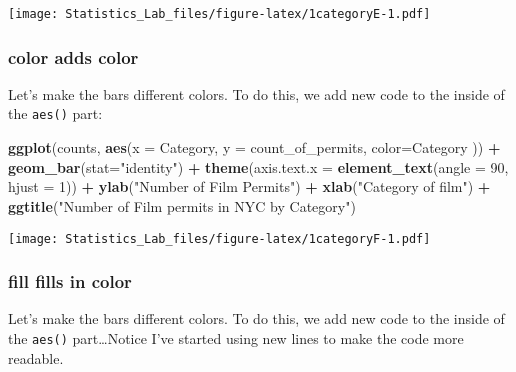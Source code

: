 \documentclass[
]{book}
\newenvironment{Shaded}{\begin{snugshade}}{\end{snugshade}}
\newcommand{\AttributeTok}[1]{\textcolor[rgb]{0.13,0.29,0.53}{#1}}
\newcommand{\DecValTok}[1]{\textcolor[rgb]{0.00,0.00,0.81}{#1}}
\newcommand{\FunctionTok}[1]{\textcolor[rgb]{0.13,0.29,0.53}{\textbf{#1}}}
\newcommand{\NormalTok}[1]{#1}
\newcommand{\SpecialCharTok}[1]{\textcolor[rgb]{0.81,0.36,0.00}{\textbf{#1}}}
\newcommand{\StringTok}[1]{\textcolor[rgb]{0.31,0.60,0.02}{#1}}
\begin{document}
\texttt{[image: Statistics\_Lab\_files/figure-latex/1categoryE-1.pdf]}

\hypertarget{color-adds-color}{%
\subsubsection{color adds color}\label{color-adds-color}}

Let's make the bars different colors. To do this, we add new code to the inside of the \texttt{aes()} part:

\begin{Shaded}
\begin{Highlighting}[]
\FunctionTok{ggplot}\NormalTok{(counts, }\FunctionTok{aes}\NormalTok{(}\AttributeTok{x =}\NormalTok{ Category, }\AttributeTok{y =}\NormalTok{ count\_of\_permits, }\AttributeTok{color=}\NormalTok{Category )) }\SpecialCharTok{+}
  \FunctionTok{geom\_bar}\NormalTok{(}\AttributeTok{stat=}\StringTok{"identity"}\NormalTok{) }\SpecialCharTok{+} 
  \FunctionTok{theme}\NormalTok{(}\AttributeTok{axis.text.x =} \FunctionTok{element\_text}\NormalTok{(}\AttributeTok{angle =} \DecValTok{90}\NormalTok{, }\AttributeTok{hjust =} \DecValTok{1}\NormalTok{)) }\SpecialCharTok{+}
  \FunctionTok{ylab}\NormalTok{(}\StringTok{"Number of Film Permits"}\NormalTok{) }\SpecialCharTok{+} 
  \FunctionTok{xlab}\NormalTok{(}\StringTok{"Category of film"}\NormalTok{) }\SpecialCharTok{+}
  \FunctionTok{ggtitle}\NormalTok{(}\StringTok{"Number of Film permits in NYC by Category"}\NormalTok{)}
\end{Highlighting}
\end{Shaded}

\texttt{[image: Statistics\_Lab\_files/figure-latex/1categoryF-1.pdf]}

\hypertarget{fill-fills-in-color}{%
\subsubsection{fill fills in color}\label{fill-fills-in-color}}

Let's make the bars different colors. To do this, we add new code to the inside of the \texttt{aes()} part\ldots Notice I've started using new lines to make the code more readable.
\end{document}
